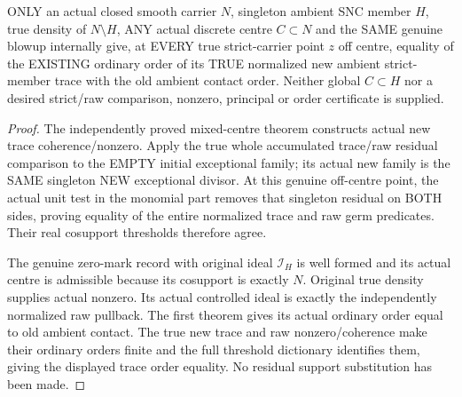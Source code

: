 \begin{theorem}
\label{hir:sharp-actual-mixed-discrete-ambient-contact-order-off-centre}
\leanok
ONLY an actual closed smooth carrier $N$, singleton ambient SNC member
$H$, true density of $N\setminus H$, ANY actual discrete centre $C\subset N$
and the SAME genuine blowup internally give, at EVERY true strict-carrier
point $z$ off centre, equality of the EXISTING ordinary order of its TRUE
normalized new ambient strict-member trace with the old ambient contact
order. Neither global $C\subset H$ nor a desired strict/raw comparison,
nonzero, principal or order certificate is supplied.
\end{theorem}
\begin{proof}
The independently proved mixed-centre theorem constructs actual new trace
coherence/nonzero. Apply the true whole accumulated trace/raw residual
comparison to the EMPTY initial exceptional family; its actual new family
is the SAME singleton NEW exceptional divisor. At this genuine off-centre
point, the actual unit test in the monomial part removes that singleton
residual on BOTH sides, proving equality of the entire normalized trace
and raw germ predicates. Their real cosupport thresholds therefore agree.

The genuine zero-mark record with original ideal $\mathcal I_H$ is
well formed and its actual centre is admissible because its cosupport
is exactly $N$. Original true density supplies actual nonzero. Its
actual controlled ideal is exactly the independently normalized raw
pullback. The first theorem gives its actual ordinary order equal to
old ambient contact. The true new trace and raw nonzero/coherence make
their ordinary orders finite and the full threshold dictionary identifies
them, giving the displayed trace order equality. No residual support
substitution has been made.
\end{proof}

